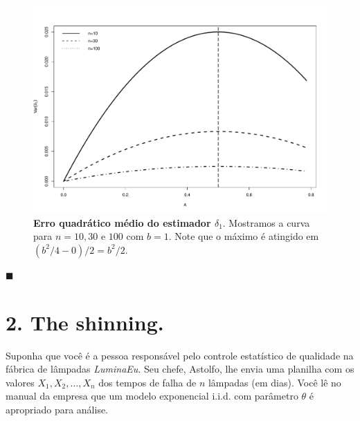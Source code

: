 \documentclass[a4paper,10pt, notitlepage]{report}
\newcommand{\rs}{X_1, X_2, \ldots, X_n} %
\begin{document}
{\begin{figure}[!ht]
\begin{center}
\includegraphics[scale=0.4]{var_delta_1.pdf}    
\end{center}
\caption{\textbf{Erro quadrático médio do estimador $\delta_1$}.
Mostramos a curva para $n=10, 30$ e $100$ com $b=1$.
Note que o máximo é atingido em $(b^2/4 - 0)/2 = b^2/2$.
}
\label{fig:var_delta_1}
\end{figure}
$\blacksquare$
}
\newpage
\section*{2. The shinning.}

Suponha que você é a pessoa responsável pelo controle estatístico de qualidade na fábrica de lâmpadas \textit{LuminaEu}.
Seu chefe, Astolfo, lhe envia uma planilha com os valores $\rs$ dos tempos de falha de $n$ lâmpadas (em dias).
Você lê no manual da empresa que um modelo exponencial i.i.d. com parâmetro $\theta$ é apropriado para análise.
\end{document}
